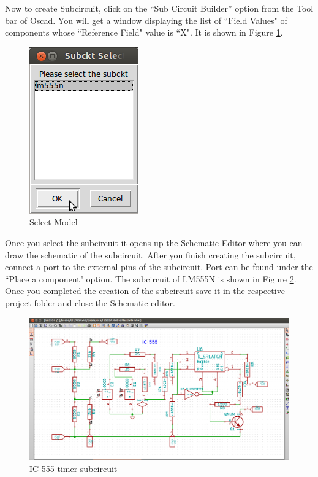 Now to create Subcircuit, click on the “Sub Circuit Builder” option from the Tool bar of Oscad. You will get a window displaying the list of ``Field Values" of components whose ``Reference Field" value is ``X". It is shown in Figure \ref{sub-sel}.


\begin{figure}[t]%
\begin{center}
\includegraphics[width=0.3\linewidth]{figures/select-subckt.png}%
\caption{Select Model}
\label{sub-sel}
\end{center}
\end{figure}


Once you select the subcircuit it opens up the Schematic Editor where you can draw the schematic of the subcircuit. After you finish creating the subcircuit, connect a port to the external pins of the subcircuit. Port can be found under the ``Place a component" option. The subcircuit of LM555N is shown in Figure \ref{555}. Once you completed the creation of the subcircuit save it in the respective project folder and close the Schematic editor. 

\begin{figure}[t]%
\begin{center}
\includegraphics[width=1\linewidth]{figures/subcircuit.png}%
\caption{IC 555 timer subcircuit}
\label{555}
\end{center}
\end{figure}

